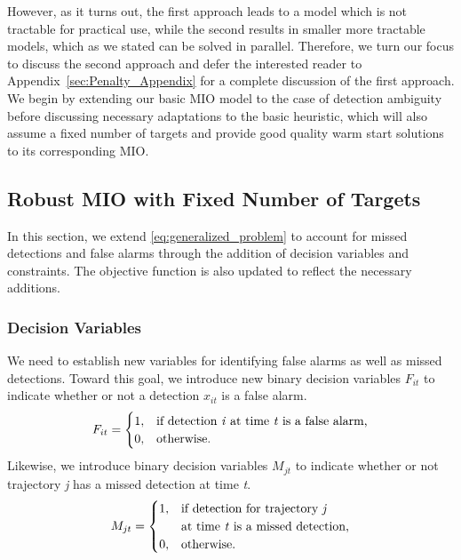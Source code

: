 However, as it turns out, the first approach leads to a model which is not tractable for practical use, while the second results in smaller more tractable models, which as we stated can be solved in parallel.
Therefore, we turn our focus to discuss the second approach and defer the interested reader to Appendix~\ref{sec:Penalty_Appendix} for a complete discussion of the first approach. We begin by extending our basic MIO model to the case of detection ambiguity before discussing necessary adaptations to the basic heuristic, which will also assume a fixed number of targets and provide good quality warm start solutions to its corresponding MIO. 

\subsection{Robust MIO with Fixed Number of Targets}
In this section, we extend \eqref{eq:generalized_problem} to account for missed detections and false alarms through the addition of decision variables and constraints. The objective function is also updated to reflect the necessary additions. 

\subsubsection{Decision Variables}
We need to establish new variables for identifying false alarms as well as missed detections. Toward this goal, we introduce new binary decision variables $F_{it}$ to indicate whether or not a detection $x_{it}$ is a false alarm. 
\[F_{it} = 
\begin{cases}
1, & \text{if detection \textit{i} at time \textit{t} is a false alarm,}\\
0, & \text{otherwise.}
\end{cases}\]
Likewise, we introduce binary decision variables $M_{jt}$ to indicate whether or not trajectory \textit{j} has a missed detection at time \textit{t}.
\[M_{jt} =
\begin{cases}
1, & \text{if detection for trajectory \textit{j}}\\
   &\text{at time \textit{t} is a missed detection,}\\
0, & \text{otherwise.}
\end{cases}\]

